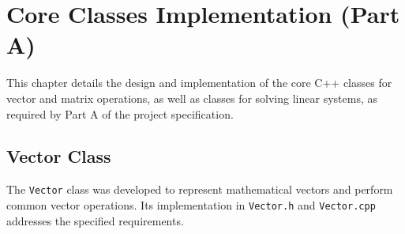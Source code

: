 \chapter{Core Classes Implementation (Part A)}
\label{chap:core_classes}

This chapter details the design and implementation of the core C++ classes for vector and matrix operations, as well as classes for solving linear systems, as required by Part A of the project specification.

\section{Vector Class}
\label{sec:vector_class}

The \texttt{Vector} class was developed to represent mathematical vectors and perform common vector operations. Its implementation in \texttt{Vector.h} and \texttt{Vector.cpp} addresses the specified requirements.

\begin{figure}

\end{figure}

